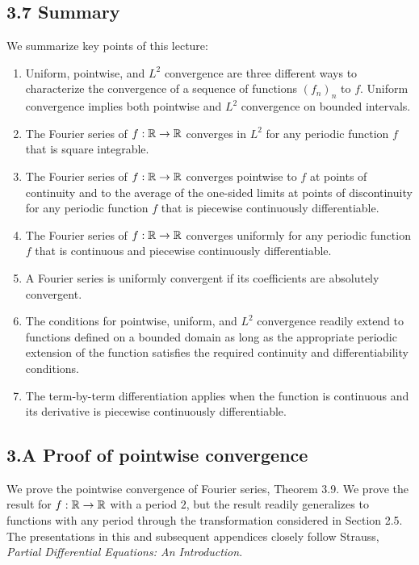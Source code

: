 \subsection{3.7 Summary}
We summarize key points of this lecture:
\begin{enumerate}
    \item Uniform, pointwise, and $L^2$ convergence are three different ways to characterize the convergence of a sequence of functions $(f_n)_n$ to $f$. Uniform convergence implies both pointwise and $L^2$ convergence on bounded intervals.
    \item The Fourier series of $f : \mathbb{R} \to \mathbb{R}$ converges in $L^2$ for any periodic function $f$ that is square integrable.
    \item The Fourier series of $f : \mathbb{R} \to \mathbb{R}$ converges pointwise to $f$ at points of continuity and to the average of the one-sided limits at points of discontinuity for any periodic function $f$ that is piecewise continuously differentiable.
    \item The Fourier series of $f : \mathbb{R} \to \mathbb{R}$ converges uniformly for any periodic function $f$ that is continuous and piecewise continuously differentiable.
    \item A Fourier series is uniformly convergent if its coefficients are absolutely convergent.
    \item The conditions for pointwise, uniform, and $L^2$ convergence readily extend to functions defined on a bounded domain as long as the appropriate periodic extension of the function satisfies the required continuity and differentiability conditions.
    \item The term-by-term differentiation applies when the function is continuous and its derivative is piecewise continuously differentiable.
\end{enumerate}

\subsection{3.A Proof of pointwise convergence}
We prove the pointwise convergence of Fourier series, Theorem 3.9. We prove the result for $f : \mathbb{R} \to \mathbb{R}$ with a period $2$, but the result readily generalizes to functions with any period through the transformation considered in Section 2.5. The presentations in this and subsequent appendices closely follow Strauss, \textit{Partial Differential Equations: An Introduction}.


